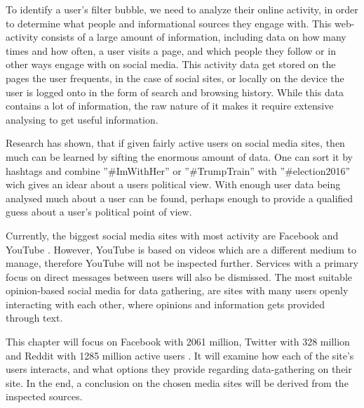 
To identify a user's filter bubble, we need to analyze their online activity, in
order to determine what people and informational sources they engage with. This
web-activity consists of a large amount of information, including data on how
many times and how often, a user visits a page, and which people they follow or
in other ways engage with on social media. This activity data get stored on the
pages the user frequents, in the case of social sites, or locally on the device
the user is logged onto in the form of search and browsing history. While this
data contains a lot of information, the raw nature of it makes it require
extensive analysing to get useful information.\nl

Research has shown, that if given fairly active users on social media sites,
then much can be learned by sifting the enormous amount of data. One can
sort it by hashtags and combine ”#ImWithHer” or ”\#TrumpTrain” with
”\#election2016” wich gives an idear about a users political view. With
enough user data being analysed much about a user can be found, perhaps
enough to provide a qualified guess about a user's political point of view.\nl


Currently, the biggest social media sites with most activity are Facebook and
YouTube \citep{SocialMediaStats}. However, YouTube is based on videos which are
a different medium to manage, therefore YouTube will not be inspected further.
Services with a primary focus on direct messages between users will also be
dismissed. The most suitable opinion-based social media for data gathering, are
sites with many users openly interacting with each other, where opinions and
information gets provided through text.\nl

This chapter will focus on Facebook with 2061 million, Twitter with 328 million
and Reddit with 1285 million active users \citep{SocialMediaStats}  \Source.
It will examine how each of the site's users interacts, and what options they provide regarding data-gathering
on their site. In the end, a conclusion on the chosen media sites will be
derived from the inspected sources.